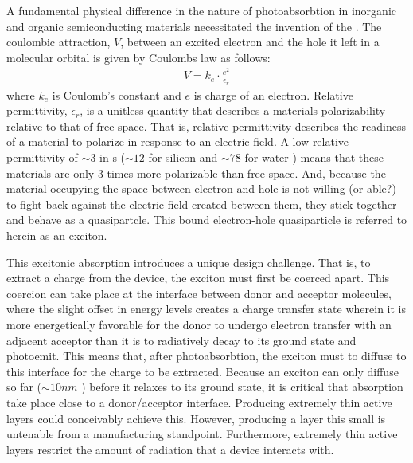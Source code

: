 A fundamental physical difference in the nature of photoabsorbtion in inorganic and organic 
semiconducting materials necessitated the
invention of the .
The coulombic attraction, $V$, between an excited
electron and the hole it left in a molecular orbital
is given by Coulombs law as follows:
\begin{align}
    \label{coulomb}
    V  = k_{e} \cdot \frac{e^{2}}{\epsilon_{r}}
\end{align}
where $k_{e}$ is Coulomb's constant and $e$ is charge of an electron.
Relative permittivity, $\epsilon_{r}$, is a unitless quantity that describes a materials polarizability relative to that of free space.
That is, relative
permittivity describes the readiness of a material
to polarize in response to an electric field. 
A low
relative permittivity of ${\sim}3$ in s (${\sim}12$ for silicon \cite{Baroni1986} and ${\sim}78$ for water \cite{George2004})
means that these materials are only $3$ times more polarizable than free space. 
And, because the material occupying the space between electron and hole %
is not willing (or able?) to fight back against the electric field created between them, they stick together and behave as a quasipartcle. 
This bound electron-hole quasiparticle is referred to herein as an exciton.

This excitonic absorption introduces a unique design challenge.
That is, to extract a charge from the device, the exciton
must first be coerced apart.
This coercion can take place at the interface between donor and acceptor molecules,
where the slight offset in energy levels creates a charge transfer state wherein it is more
energetically favorable for the donor to undergo electron transfer with an adjacent acceptor than
it is to radiatively decay to its ground state and photoemit.
This means that, after photoabsorbtion, the exciton must to diffuse to this interface for the charge to be
extracted.
Because an exciton can only diffuse so far (${\sim}10nm$ \cite{clarke2010}) before it relaxes to
its ground state, it is critical that absorption take place close to a donor/acceptor
interface. 
Producing extremely thin active layers could conceivably achieve this.
However,
producing a layer this small is untenable from a manufacturing standpoint.
Furthermore, extremely thin active
layers restrict the amount of radiation that a device interacts with. 

